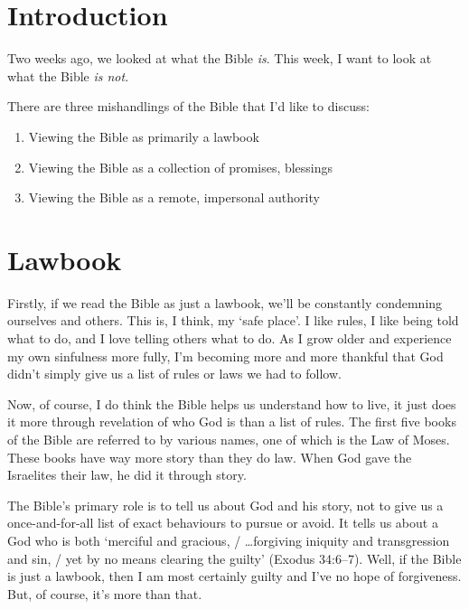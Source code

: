 \newcommand{\Date}{February 28, 2021}
\newcommand{\Title}{Teaching: What the Bible Is Not}



\section{Introduction}

Two weeks ago, we looked at what the Bible \textit{is}. This week, I want to look at
what the Bible \textit{is not}.

There are three mishandlings of the Bible that I'd like to discuss:

\begin{enumerate}
    \item Viewing the Bible as primarily a lawbook
    \item Viewing the Bible as a collection of promises, blessings
    \item Viewing the Bible as a remote, impersonal authority
\end{enumerate}

\section{Lawbook}

Firstly, if we read the Bible as just a lawbook, we'll be constantly condemning
ourselves and others. This is, I think, my `safe place'. I like rules, I like
being told what to do, and I love telling others what to do. As I grow older and
experience my own sinfulness more fully, I'm becoming more and more thankful
that God didn't simply give us a list of rules or laws we had to follow.

Now, of course, I do think the Bible helps us understand how to live, it just
does it more through revelation of who God is than a list of rules. The first
five books of the Bible are referred to by various names, one of which is the
Law of Moses. These books have way more story than they do law. When God gave
the Israelites their law, he did it through story.

The Bible's primary role is to tell us about God and his story, not to give us a
once-and-for-all list of exact behaviours to pursue or avoid. It tells us about
a God who is both `merciful and gracious, / \dots forgiving iniquity and
transgression and sin, / yet by no means clearing the guilty' (Exodus 34:6--7).
Well, if the Bible is just a lawbook, then I am most certainly guilty and I've
no hope of forgiveness. But, of course, it's more than that.


